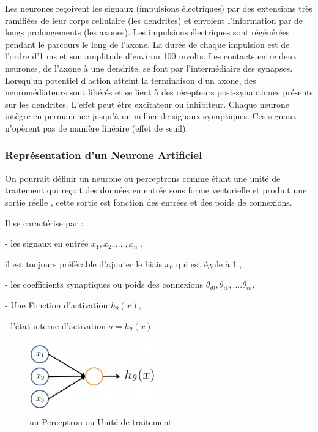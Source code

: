 Les neurones reçoivent les signaux (impulsions électriques) par des extensions très ramifiées de leur corps cellulaire (les dendrites) et envoient l'information par de longs prolongements (les axones). Les impulsions électriques sont régénérées pendant le parcours le long de l'axone. La durée de chaque impulsion est de l'ordre d'1 ms et son amplitude d'environ 100 mvolts.
Les contacts entre deux neurones, de l'axone à une dendrite, se font par l'intermédiaire des synapses. Lorsqu'un potentiel d'action atteint la terminaison d'un axone, des neuromédiateurs sont libérés et se lient à des récepteurs post-synaptiques présents sur les dendrites. L'effet peut être excitateur ou inhibiteur.
Chaque neurone intègre en permanence jusqu'à un millier de signaux synaptiques. Ces signaux n'opèrent pas de manière linéaire (effet de seuil).

\subsubsection{Représentation d'un Neurone Artificiel }
On pourrait définir un neurone  ou perceptrons comme étant une unité de traitement qui reçoit des données en entrée sous forme vectorielle et produit une sortie réelle , cette sortie est fonction des entrées et des poids de connexions.

Il se caractérise par :

- les signaux en entrée  ${x}_{1},{x}_{2},....,{x}_{n}$ ,

 il est toujours préférable d'ajouter le biais ${x}_{0}$ qui est égale à 1.,

- les coefficients synaptiques ou poids des connexions ${\theta}_{i0},{\theta}_{i1},....{\theta}_{in}$,

- Une Fonction d'activation ${h}_{\theta}(x)$,

- l'état interne d'activation $a={h}_{\theta}(x)$

\begin{figure}[ht]
	\centering
	\includegraphics[width=0.5\textwidth]{fig/SimpleANN.png}
	\caption{un Perceptron  ou Unité de traitement}
	\label{fig:image10}
\end{figure}

